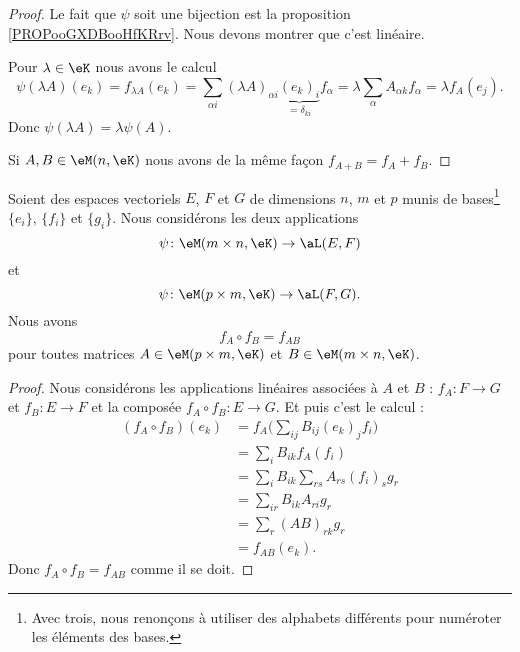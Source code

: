 \begin{proof}
    Le fait que \( \psi\) soit une bijection est la proposition \ref{PROPooGXDBooHfKRrv}. Nous devons montrer que c'est linéaire. 

    Pour \( \lambda\in \eK\) nous avons le calcul
    \begin{equation}
        \psi(\lambda A)(e_k)=f_{\lambda A}(e_k)=\sum_{\alpha i}(\lambda A)_{\alpha i}\underbrace{(e_k)_i}_{=\delta_{ki}}f_{\alpha}=\lambda\sum_{\alpha}A_{\alpha k}f_{\alpha}=\lambda f_A(e_j).
    \end{equation}
    Donc \( \psi(\lambda A)=\lambda\psi(A)\).

    Si \( A,B\in \eM(n,\eK)\) nous avons de la même façon \( f_{A+B}=f_A+f_B\).
\end{proof}

\begin{proposition}     \label{PROPooCSJNooEqcmFm}
    Soient des espaces vectoriels \( E\), \( F\) et \( G\) de dimensions \( n\), \( m\) et \( p\) munis de bases\footnote{Avec trois, nous renonçons à utiliser des alphabets différents pour numéroter les éléments des bases.} \( \{ e_i \}\), \( \{ f_i \}\) et \( \{ g_i \}\). Nous considérons les deux applications
    \begin{equation}
        \psi\colon \eM(m\times n,\eK)\to \aL(E,F)
    \end{equation}
    et
    \begin{equation}
        \psi\colon \eM(p\times m,\eK)\to \aL(F,G).
    \end{equation}
    Nous avons 
    \begin{equation}
        f_A\circ f_B=f_{AB}
    \end{equation}
    pour toutes matrices \( A\in \eM(p\times m,\eK)\) et \( B\in \eM(m\times n,\eK)\).
\end{proposition}

\begin{proof}
    Nous considérons les applications linéaires associées à \( A\) et \( B\) : \( f_A\colon F\to G\) et \( f_B\colon E\to F\) et la composée \( f_A\circ f_B\colon E\to G\). Et puis c'est le calcul :
    \begin{subequations}
        \begin{align}
            (f_A\circ f_B)(e_k)&=f_A\big( \sum_{ij}B_{ij}(e_k)_jf_i \big)\\
            &=\sum_i B_{ik}f_A(f_i)\\
            &=\sum_iB_{ik}\sum_{rs}A_{rs}(f_i)_sg_r\\
            &=\sum_{ir}B_{ik}A_{ri}g_r\\
            &=\sum_r(AB)_{rk}g_r\\
            &=f_{AB}(e_k).
        \end{align}
    \end{subequations}
    Donc \( f_A\circ f_B=f_{AB}\) comme il se doit.
\end{proof}
    
